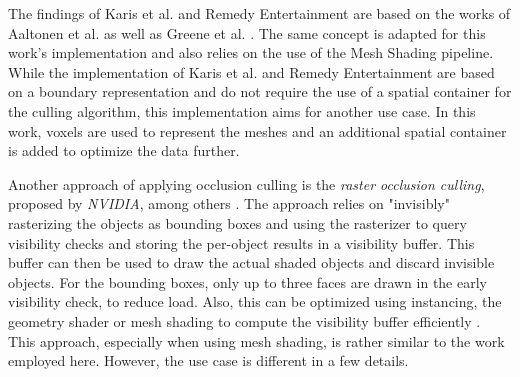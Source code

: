 \noindent
The findings of Karis et al. and Remedy Entertainment are based on the works of Aaltonen et al. \cite{Aaltonen2015}
as well as Greene et al. \cite{Greene93,Greene95}. The same concept is adapted for this work's implementation and 
also relies on the use of the Mesh Shading pipeline.\\

\noindent
While the implementation of Karis et al. and Remedy Entertainment are based on a boundary representation and do not 
require the use of a spatial container for the culling algorithm, this implementation aims for another use case. 
In this work, voxels are used to represent the meshes and an additional spatial container is added to optimize the 
data further. 





Another approach of applying occlusion culling is the \emph{raster occlusion culling}, proposed by \emph{NVIDIA}, among 
others \cite{NVIDIAGLOC2016}. The approach relies on "invisibly" rasterizing the objects as bounding boxes and using the 
rasterizer to query visibility checks and storing the per-object results in a visibility buffer. This buffer can then be 
used to draw the actual shaded objects and discard invisible objects. For the bounding boxes, only up to three faces are 
drawn in the early visibility check, to reduce load. Also, this can be optimized using instancing, the geometry shader or 
mesh shading to compute the visibility buffer efficiently \cite{NVIDIAGLOC2016}. This approach, especially when using 
mesh shading, is rather similar to the work employed here. However, the use case is different in a few details.


